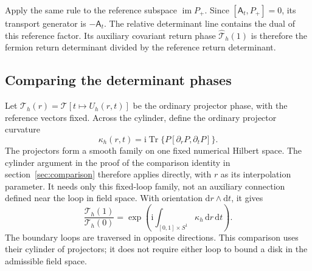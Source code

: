 \documentclass[11pt,a4paper]{article}
\theoremstyle{remark}
\DeclareMathOperator{\Tr}{Tr}
\DeclareMathOperator{\im}{im}
\newcommand{\dd}{\mathrm d}
\newcommand{\ii}{\mathrm i}
\begin{document}
Apply the same rule to the reference subspace $\im P_+$.
Since $[\mathsf A_t,P_+]=0$, its transport generator is
$-\mathsf A_t$. The relative determinant line contains the dual of
this reference factor. Its auxiliary covariant return phase
$\widehat{\mathcal T}_h(1)$ is therefore the fermion return determinant
divided by the reference return determinant.

\subsection{Comparing the determinant phases}

Let $\mathcal T_h(r)=\mathcal T[t\mapsto U_h(r,t)]$ be the ordinary
projector phase, with the reference vectors fixed. Across the cylinder,
define the ordinary projector curvature
\begin{equation}
 \kappa_h(r,t)=\ii\Tr\{P[\partial_rP,\partial_tP]\}.
 \label{eq:ordinary-cylinder-curvature}
\end{equation}
The projectors form a smooth family on one fixed numerical Hilbert
space. The cylinder argument in the proof of the comparison identity
in section~\ref{sec:comparison} therefore applies directly, with $r$
as its interpolation parameter. It needs only this fixed-loop family,
not an auxiliary connection defined near the loop in field space.
With orientation
$\dd r\wedge\dd t$, it gives
\begin{equation}
 \frac{\mathcal T_h(1)}{\mathcal T_h(0)}
 =\exp\!\left(\ii\int_{[0,1]\times S^1}
                              \kappa_h\,\dd r\,\dd t\right).
 \label{eq:ordinary-cylinder-holonomy}
\end{equation}
The boundary loops are traversed in opposite directions. This comparison
uses their cylinder of projectors; it does not require either loop to
bound a disk in the admissible field space.
\end{document}
